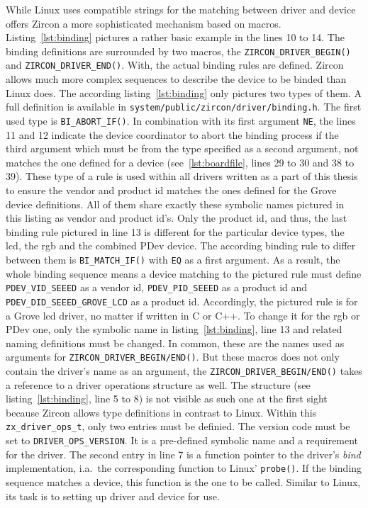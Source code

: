 While Linux uses compatible strings for the matching between driver and device offers Zircon a more sophisticated mechanism based on macros.
Listing~\ref{lst:binding} pictures a rather basic example in the lines 10 to 14.
The binding definitions are surrounded by two macros, the \texttt{ZIRCON_DRIVER_BEGIN()} and \texttt{ZIRCON_DRIVER_END()}.
With, the actual binding rules are defined.
Zircon allows much more complex sequences to describe the device to be binded than Linux does.
The according listing~\ref{lst:binding} only pictures two types of them.
A full definition is available in \texttt{system/public/zircon/driver/binding.h}.
The first used type is \texttt{BI_ABORT_IF()}.
In combination with its first argument \texttt{NE}, the lines 11 and 12 indicate the device coordinator to abort the binding process if the third argument which must be from the type specified as a second argument, not matches the one defined for a device (see~\ref{lst:boardfile}, lines 29 to 30 and 38 to 39).
These type of a rule is used within all drivers written as a part of this thesis to ensure the vendor and product id matches the ones defined for the Grove device definitions.
All of them share exactly these symbolic names pictured in this listing as vendor and product id's.
Only the product id, and thus, the last binding rule pictured in line 13 is different for the particular device types, the \ac{lcd}, the \ac{rgb} and the combined PDev device.
The according binding rule to differ between them is \texttt{BI_MATCH_IF()} with \texttt{EQ} as a first argument.
As a result, the whole binding sequence means a device matching to the pictured rule must define \texttt{PDEV\_VID\_SEEED} as a vendor id, \texttt{PDEV\_PID\_SEEED} as a product id and \texttt{PDEV\_DID\_SEEED\_GROVE\_LCD} as a product id.
Accordingly, the pictured rule is for a Grove \ac{lcd} driver, no matter if written in C or C++.
To change it for the \ac{rgb} or PDev one, only the symbolic name in listing~\ref{lst:binding}, line 13 and related naming definitions must be changed.
In common, these are the names used as arguments for \texttt{ZIRCON_DRIVER_BEGIN/END()}.
But these macros does not only contain the driver's name as an argument, the \texttt{ZIRCON_DRIVER_BEGIN/END()} takes a reference to a driver operations structure as well.
The structure (see listing~\ref{lst:binding}, line 5 to 8) is not visible as such one at the first sight because Zircon allows type definitions in contrast to Linux.
Within this \texttt{zx_driver_ops_t}, only two entries must be definied.
The version code must be set to \texttt{DRIVER_OPS_VERSION}.
It is a pre-defined symbolic name and a requirement for the driver.
The second entry in line 7 is a function pointer to the driver's \textit{bind} implementation, i.a.\ the corresponding function to Linux' \texttt{probe()}.
If the binding sequence matches a device, this function is the one to be called.
Similar to Linux, its task is to setting up driver and device for use.

